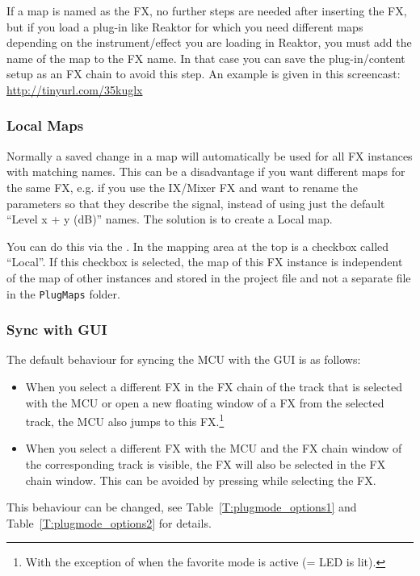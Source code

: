 If a map is named as the FX, no further steps are needed after
inserting the FX, but if you load a plug-in like Reaktor for which you
need different maps depending on the instrument/effect you are loading
in Reaktor, you must add the name of the map to the FX name. In that
case you can save the plug-in/content setup as an FX chain to avoid
this step. An example is given in this screencast:
\url{http://tinyurl.com/35kuglx}

\subsubsection{Local Maps}\label{localmaps}

Normally a saved change in a map will automatically be used for all FX instances
with matching names. This can be a disadvantage if you want different maps for
the same FX, e.g. if you use the IX/Mixer FX and want to rename the
parameters so that they describe the signal, instead of using just
the default ``Level x + y (dB)'' names. The solution is to create a Local map.

You can do this via the \mapeditor. In the mapping area at the top is
a checkbox called ``Local''. If this checkbox is selected, the map of
this FX instance is independent of the map of other instances and
stored in the \reaper project file and not a separate file in the
\verb|PlugMaps| folder.

\subsubsection{Sync with \reaper GUI}\label{plugsync}
The default behaviour for syncing the MCU with the \reaper GUI is as follows: 
\begin{itemize}
\item When you select a different FX in the FX chain of the track that is
selected with the MCU or open a new floating window of a FX from the 
selected track, the MCU also jumps to this FX.\footnote{With the exception 
of when the favorite mode is active (= \gv LED is lit).}
\item When you select a different FX with the MCU and the \reaper FX chain
window of the corresponding track is visible, the FX will also be selected in
the FX chain window. This can be avoided by pressing \option while selecting the FX.
\end{itemize}

\noindent
This behaviour can be changed, see Table~\ref{T:plugmode_options1} and
Table~\ref{T:plugmode_options2} for details.


